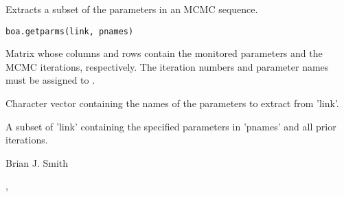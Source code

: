\begin{Description}\relax
Extracts a subset of the parameters in an MCMC sequence.
\end{Description}
\begin{Usage}
\begin{verbatim}
boa.getparms(link, pnames)
\end{verbatim}
\end{Usage}
\begin{Arguments}
\begin{ldescription}
\item[\code{link}] Matrix whose columns and rows contain the monitored parameters
and the MCMC iterations, respectively. The iteration numbers and parameter
names must be assigned to .
\item[\code{pnames}] Character vector containing the names of the parameters to
extract from 'link'.
\end{ldescription}
\end{Arguments}
\begin{Value}
A subset of 'link' containing the specified parameters in 'pnames' and all
prior iterations.
\end{Value}
\begin{Author}\relax
Brian J. Smith
\end{Author}
\begin{SeeAlso}\relax
{}, 
\end{SeeAlso}

